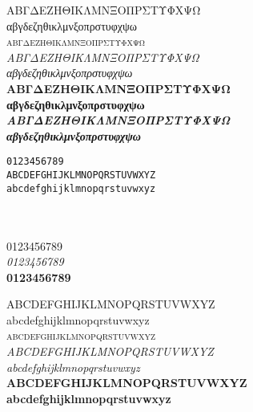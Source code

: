 \documentclass[10pt, twoside]{lecturenotes}
\begin{document}
\begin{sloppypar}
\begin{figure}[ht]
{\begin{minipage}[b]{0.45\linewidth}
\noindent
ΑΒΓΔΕΖΗΘΙΚΛΜΝΞΟΠΡΣΤΥΦΧΨΩ\\
αβγδεζηθικλμνξοπρστυφχψω\\
\textsc{αβγδεζηθικλμνξοπρστυφχψω}\\
\textit{ΑΒΓΔΕΖΗΘΙΚΛΜΝΞΟΠΡΣΤΥΦΧΨΩ\\
αβγδεζηθικλμνξοπρστυφχψω \\}
\textbf{ΑΒΓΔΕΖΗΘΙΚΛΜΝΞΟΠΡΣΤΥΦΧΨΩ\\
αβγδεζηθικλμνξοπρστυφχψω}\\
\textbf{\textit{ΑΒΓΔΕΖΗΘΙΚΛΜΝΞΟΠΡΣΤΥΦΧΨΩ\\
αβγδεζηθικλμνξοπρστυφχψω}}\\


\end{minipage}
\hspace{0.5cm}
\begin{minipage}[b]{0.45\linewidth}

\noindent
\texttt{0123456789}\\


\noindent\texttt{ABCDEFGHIJKLMNOPQRSTUVWXYZ\\
abcdefghijklmnopqrstuvwxyz\\
}

\noindent
{}\\
\\

\noindent
\textsf{%
0123456789\\
\textit{0123456789}\\
\textbf{0123456789}\\
}

\noindent
\textsf{%
ABCDEFGHIJKLMNOPQRSTUVWXYZ\\
abcdefghijklmnopqrstuvwxyz\\
\textsc{abcdefghijklmnopqrstuvwxyz}\\
\textit{ABCDEFGHIJKLMNOPQRSTUVWXYZ\\
abcdefghijklmnopqrstuvwxyz}\\
\textbf{ABCDEFGHIJKLMNOPQRSTUVWXYZ\\
abcdefghijklmnopqrstuvwxyz}\\
}


\end{minipage}}
\end{figure}
\end{sloppypar}
\end{document}
